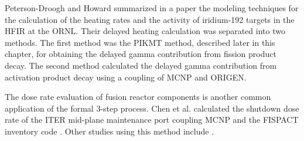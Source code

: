 Peterson-Droogh and Howard \cite{peterson-droogh_current_2018} summarized in a paper the modeling techniques for the calculation of the heating rates and the activity of iridium-192 targets in the \gls*{HFIR} at the \gls*{ORNL}.
Their delayed heating calculation was separated into two methods.
The first method was the PIKMT method, described later in this chapter, for obtaining the delayed gamma contribution from fission product decay.
The second method calculated the delayed gamma contribution from activation product decay using a coupling of MCNP and ORIGEN.

The dose rate evaluation of fusion reactor components is another common application of the formal 3-step process.
Chen et al. \cite{chen_rigorous_2002} calculated the shutdown dose rate of the \gls*{ITER} mid-plane maintenance port coupling MCNP and the FISPACT inventory code \cite{forrest_fispact_1998}.
Other studies using this method include \cite{serikov_advanced_2002, sauvan_development_2016}.

